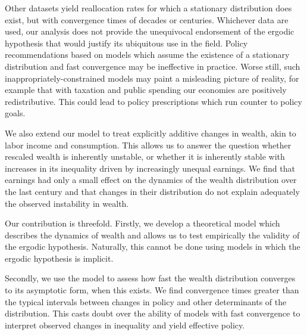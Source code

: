 Other datasets yield reallocation rates for which a stationary distribution does exist, but with convergence times of decades or centuries. Whichever data are used, our analysis does not provide the unequivocal endorsement of the ergodic hypothesis that would justify its ubiquitous use in the field. Policy recommendations based on models which assume the existence of a stationary distribution and fast convergence may be ineffective in practice. Worse still, such inappropriately-constrained models may paint a misleading picture of reality, for example that with taxation and public spending our economies are positively redistributive. This could lead to policy prescriptions which run counter to policy goals.

We also extend our model to treat explicitly additive changes in wealth, akin to labor income and consumption. This allows us to answer the question whether rescaled wealth is inherently unstable, or whether it is inherently stable with increases in its inequality driven by increasingly unequal earnings. We find that earnings had only a small effect on the dynamics of the wealth distribution over the last century
and that changes in their distribution do not explain adequately the observed instability in wealth.

Our contribution is threefold. Firstly, we develop a theoretical model which describes the dynamics of wealth and allows us to test empirically the validity of the ergodic hypothesis. Naturally, this cannot be done using models in which the ergodic hypothesis is implicit.

Secondly, we use the model to assess how fast the wealth distribution converges to its asymptotic form, when this exists. We find convergence times greater than the typical intervals between changes in policy and other determinants of the distribution. This casts doubt over the ability of models with fast convergence to interpret observed changes in inequality and yield effective policy.


